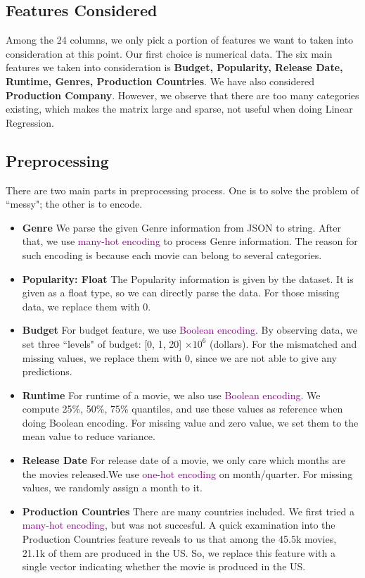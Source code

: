 \documentclass[12pt]{article}
\begin{document}
\subsection{Features Considered}
Among the 24 columns, we only pick a portion of features we want to taken into consideration at this point. Our first choice is numerical data. The six main features we taken into consideration is \textbf{Budget, Popularity, Release Date, Runtime, Genres, Production Countries}. We have also considered \textbf{Production Company}. However, we observe that there are too many categories existing, which makes the matrix large and sparse, not useful when doing Linear Regression.
\subsection{Preprocessing}
There are two main parts in preprocessing process. One is to solve the problem of ``messy"; the other is to encode.
\begin{itemize}
    \item \textbf{Genre} We parse the given Genre information from JSON to string. After that, we use \textcolor{purple}{many-hot encoding} to process Genre information. The reason for such encoding is because each movie can belong to several categories.
    \item \textbf{Popularity: Float} The Popularity information is given by the dataset. It is given as a float type, so we can directly parse the data. For those missing data, we replace them with 0.
    \item \textbf{Budget} For budget feature, we use \textcolor{purple}{Boolean encoding}. By observing data, we set three ``levels" of budget: [0, 1, 20] $\times10^6$ (dollars). For the mismatched and missing values, we replace them with 0, since we are not able to give any predictions.
    \item \textbf{Runtime} For runtime of a movie, we also use \textcolor{purple}{Boolean encoding}. We compute 25\%, 50\%, 75\% quantiles, and use these values as reference when doing Boolean encoding. For missing value and zero value, we set them to the mean value to reduce variance.
    \item \textbf{Release Date} For release date of a movie, we only care which months are the movies released.We use \textcolor{purple}{one-hot encoding} on month/quarter. For missing values, we randomly assign a month to it.
    \item \textbf{Production Countries} There are many countries included. We first tried a \textcolor{purple}{many-hot encoding}, but was not succesful. A quick examination into the Production Countries feature reveals to us that among the 45.5k movies, 21.1k of them are produced in the US. So, we replace this feature with a single vector indicating whether the movie is produced in the US.
\end{itemize}
\end{document}
